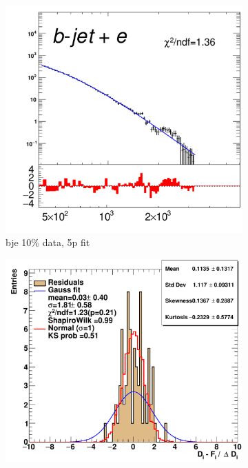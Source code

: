 \begin{figure}[H]
    \centering
    \begin{subfigure}[h]{0.38\linewidth}
    \includegraphics[scale=0.3]{figs/app/10data/pub_mass_10per_extrapolate_be.pdf}%
    \caption{bje 10\% data, 5p fit }
    \end{subfigure}
    \hfill
    \begin{subfigure}[h]{0.4\linewidth}
    \includegraphics[scale=0.32]{figs/app/10data/pub_mass_10per_extrapolate_residuals_be.pdf}%

\end{subfigure}
\end{figure}
